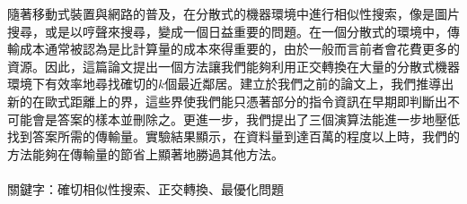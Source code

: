 \begin{abstractCH}

隨著移動式裝置與網路的普及，在分散式的機器環境中進行相似性搜索，像是圖片搜尋，或是以哼聲來搜尋，變成一個日益重要的問題。在一個分散式的環境中，傳輸成本通常被認為是比計算量的成本來得重要的，由於一般而言前者會花費更多的資源。因此，這篇論文提出一個方法讓我們能夠利用正交轉換在大量的分散式機器環境下有效率地尋找確切的$k$個最近鄰居。建立於我們之前的論文上，我們推導出新的在歐式距離上的界，這些界使我們能只憑著部分的指令資訊在早期即判斷出不可能會是答案的樣本並刪除之。更進一步，我們提出了三個演算法能進一步地壓低找到答案所需的傳輸量。實驗結果顯示，在資料量到達百萬的程度以上時，我們的方法能夠在傳輸量的節省上顯著地勝過其他方法。
\\
\\
  關鍵字：確切相似性搜索、正交轉換、最優化問題

\end{abstractCH}
